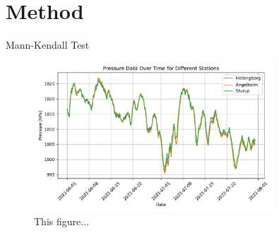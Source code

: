 \section{Method}

Mann-Kendall Test 

\begin{figure}[H]
    \centering    \includegraphics[width=0.8\textwidth]{Figures/Pressure_difference.pdf}
    \caption{This figure...}
    \label{fig:Pressure_difference}
\end{figure}
